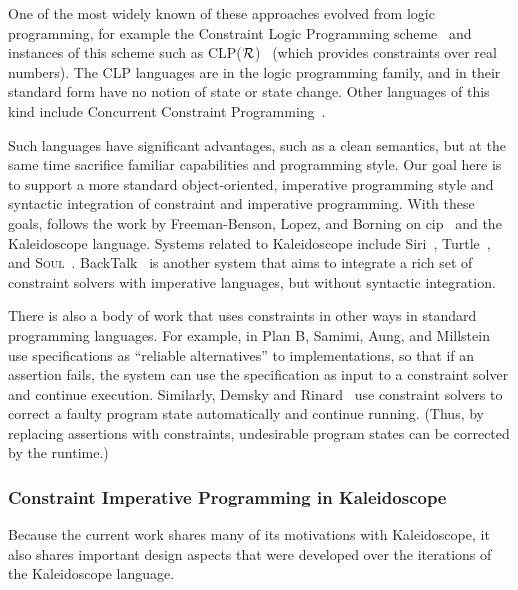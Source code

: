 One of the most widely known of these approaches evolved from logic
programming, for example the Constraint Logic Programming
scheme~\cite{jaffar-popl-1987} and instances of this scheme such as
CLP($\cal R$)~\cite{jaffar-toplas-1992} (which provides constraints
over real numbers). The CLP languages are in the logic programming
family, and in their standard form have no notion of state or state
change.  Other languages of this kind include Concurrent Constraint
Programming~\cite{saraswat-book}.

Such languages have significant advantages, such as a clean semantics,
but at the same time sacrifice familiar capabilities and programming
style.  Our goal here is to support a more standard object-oriented,
imperative programming style and syntactic integration of constraint
and imperative programming.  With these goals, \langname follows the
work by Freeman-Benson, Lopez, and Borning on
\ac{cip}~\cite{freeman-benson-ecoop-1992,lopez-ecoop-1994,lopez-oopsla-1994,lopez-asi-1994}
and the Kaleidoscope language. Systems related to Kaleidoscope include
Siri~\cite{horn-oopsla-1992}, Turtle~\cite{grabmuller2004turtle}, and
\textsc{Soul}~\cite{d2004seamless}. BackTalk~\cite{roy1997reifying} is
another system that aims to integrate a rich set of constraint solvers
with imperative languages, but without syntactic integration.

There is also a body of work that uses constraints in other ways in
standard programming languages.  For example, in Plan B, Samimi, Aung, and
Millstein \cite{samimi-ecoop-2010} use specifications as ``reliable
alternatives'' to implementations, so that if an assertion fails, the
system can use the specification as input to a constraint solver and
continue execution.  Similarly, Demsky and Rinard~\cite{demsky2006goal}
use constraint solvers to correct a faulty program state automatically
and continue running.  (Thus, by replacing assertions with
constraints, undesirable program states can be corrected by the
runtime.)

\subsubsection*{Constraint Imperative Programming in Kaleidoscope}
Because the current work shares many of its motivations with
Kaleidoscope, it also shares important design aspects that were
developed over the iterations of the Kaleidoscope language.

